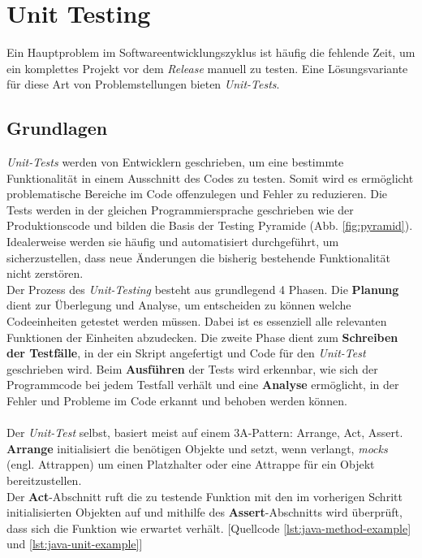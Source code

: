 \section{Unit Testing}
Ein Hauptproblem im Softwareentwicklungszyklus ist häufig die fehlende Zeit, um ein komplettes Projekt vor dem \textit{Release} manuell zu testen. \cite*{SoftwareQualityLab} Eine Lösungsvariante für diese Art von Problemstellungen bieten \textit{Unit-Tests}. 

\subsection{Grundlagen}
\textit{Unit-Tests} werden von Entwicklern geschrieben, um eine bestimmte Funktionalität in einem Ausschnitt des Codes zu testen. Somit wird es ermöglicht problematische Bereiche im Code offenzulegen und Fehler zu reduzieren. \cite*{tosunEffectivenessUnitTests2018} Die Tests werden in der gleichen Programmiersprache geschrieben wie der Produktionscode und bilden die Basis der Testing Pyramide (Abb. \ref{fig:pyramid}). Idealerweise werden sie häufig und automatisiert durchgeführt, um sicherzustellen, dass neue Änderungen die bisherig bestehende Funktionalität nicht zerstören. \cite*{TestingPyramidStrategic2024}\\
Der Prozess des \textit{Unit-Testing} besteht aus grundlegend 4 Phasen. Die \textbf{Planung} dient zur Überlegung und Analyse, um entscheiden zu können welche Codeeinheiten getestet werden müssen. Dabei ist es essenziell alle relevanten Funktionen der Einheiten abzudecken. \cite*{bakharevUnitTestingDefinition2023} Die zweite Phase dient zum \textbf{Schreiben der Testfälle}, in der ein Skript angefertigt und Code für den \textit{Unit-Test} geschrieben wird. \cite*{bakharevUnitTestingDefinition2023} Beim \textbf{Ausführen} der Tests wird erkennbar, wie sich der Programmcode bei jedem Testfall verhält und eine \textbf{Analyse} ermöglicht, in der Fehler und Probleme im Code erkannt und behoben werden können.\cite*{bakharevUnitTestingDefinition2023}\\\\
Der \textit{Unit-Test} selbst, basiert meist auf einem 3A-Pattern: Arrange, Act, Assert. \\\textbf{Arrange} initialisiert die benötigen Objekte und setzt, wenn verlangt, \textit{mocks} (engl. Attrappen) um einen Platzhalter oder eine Attrappe für ein Objekt bereitzustellen.\\ Der \textbf{Act}-Abschnitt ruft die zu testende Funktion mit den im vorherigen Schritt initialisierten Objekten auf und mithilfe des \textbf{Assert}-Abschnitts wird überprüft, dass sich die Funktion wie erwartet verhält. \cite*{ikechiHowStructureUnit2021} [Quellcode \ref{lst:java-method-example} und \ref{lst:java-unit-example}]\\
